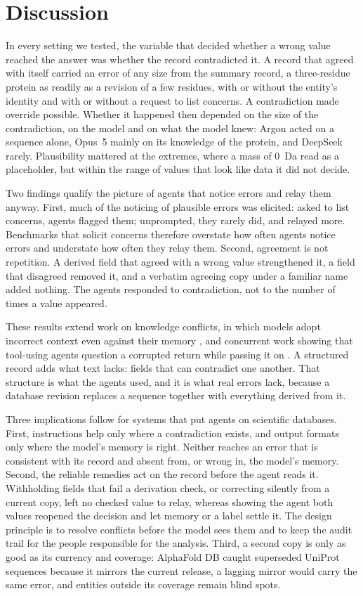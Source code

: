 \section*{Discussion}

In every setting we tested, the variable that decided whether a wrong value reached the answer was whether the record contradicted it. A record that agreed with itself carried an error of any size from the summary record, a three-residue protein as readily as a revision of a few residues, with or without the entity's identity and with or without a request to list concerns. A contradiction made override possible. Whether it happened then depended on the size of the contradiction, on the model and on what the model knew: Argon acted on a sequence alone, Opus~5 mainly on its knowledge of the protein, and DeepSeek rarely. Plausibility mattered at the extremes, where a mass of 0~Da read as a placeholder, but within the range of values that look like data it did not decide.

Two findings qualify the picture of agents that notice errors and relay them anyway. First, much of the noticing of plausible errors was elicited: asked to list concerns, agents flagged them; unprompted, they rarely did, and relayed more. Benchmarks that solicit concerns therefore overstate how often agents notice errors and understate how often they relay them. Second, agreement is not repetition. A derived field that agreed with a wrong value strengthened it, a field that disagreed removed it, and a verbatim agreeing copy under a familiar name added nothing. The agents responded to contradiction, not to the number of times a value appeared.

These results extend work on knowledge conflicts, in which models adopt incorrect context even against their memory \citep{xu2024conflicts,wu2024clasheval,xie2024adaptive}, and concurrent work showing that tool-using agents question a corrupted return while passing it on \citep{yang2026overreliance}. A structured record adds what text lacks: fields that can contradict one another. That structure is what the agents used, and it is what real errors lack, because a database revision replaces a sequence together with everything derived from it.

Three implications follow for systems that put agents on scientific databases. First, instructions help only where a contradiction exists, and output formats only where the model's memory is right. Neither reaches an error that is consistent with its record and absent from, or wrong in, the model's memory. Second, the reliable remedies act on the record before the agent reads it. Withholding fields that fail a derivation check, or correcting silently from a current copy, left no checked value to relay, whereas showing the agent both values reopened the decision and let memory or a label settle it. The design principle is to resolve conflicts before the model sees them and to keep the audit trail for the people responsible for the analysis. Third, a second copy is only as good as its currency and coverage: AlphaFold DB caught superseded UniProt sequences because it mirrors the current release, a lagging mirror would carry the same error, and entities outside its coverage remain blind spots.

